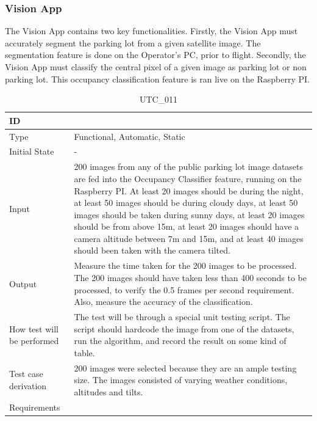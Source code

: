 \documentclass[12pt, titlepage]{article}
\begin{document}
\subsubsection{Vision App}

The Vision App contains two key functionalities. Firstly, the Vision App must accurately segment the parking lot from a given satellite image. The segmentation feature is done on the Operator's PC, prior to flight. Secondly, the Vision App must classify the central pixel of a given image as parking lot or non parking lot. This occupancy classification feature is ran live on the Raspberry PI.  

\begin{table}[!h]
\begin{center}
\caption {UTC\_011}
\label{tab:UTC_011}
\begin{tabular}{ | m{3.2cm} | m{12.2cm} | } 
\hline
ID & \nameref{tab:UTC_011} \\ 
\hline
Type &  Functional, Automatic, Static  \\ 
\hline
Initial State & -\\ 
\hline
Input &  200 images from any of the public parking lot image datasets are fed into the Occupancy Classifier feature, running on the Raspberry PI. At least 20 images should be during the night, at least 50 images should be during cloudy days, at least 50 images should be taken during sunny days, at least 20 images should be from above 15m, at least 20 images should have a camera altitude between 7m and 15m, and at least 40 images should been taken with the camera tilted.\\ 
\hline
Output &  Measure the time taken for the 200 images to be processed. The 200 images should have taken less than 400 seconds to be processed, to verify the 0.5 frames per second requirement. Also, measure the accuracy of the classification. \\ 
\hline
How test will be performed & The test will be through a special unit testing script. The script should hardcode the image from one of the datasets, run the algorithm, and record the result on some kind of table. \\ 
\hline
Test case derivation & 200 images were selected because they are an ample testing size. The images consisted of varying weather conditions, altitudes and tilts.  \\ 
\hline
Requirements & \nameref{GEN_005} \\ 
\hline
\end{tabular}
\end{center}
\end{table}
\end{document}
